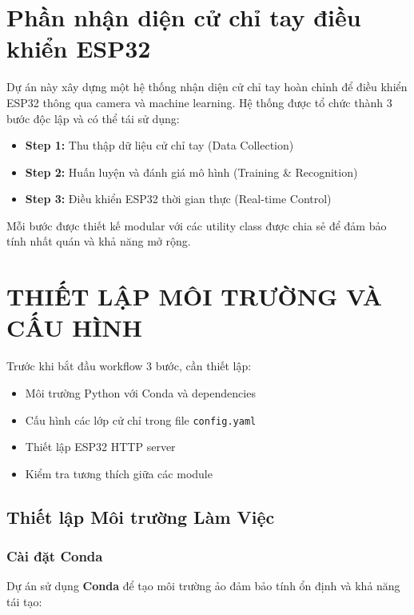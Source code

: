 \section{Phần nhận diện cử chỉ tay điều khiển ESP32}

Dự án này xây dựng một hệ thống nhận diện cử chỉ tay hoàn chỉnh để điều khiển ESP32 thông qua camera và machine learning. Hệ thống được tổ chức thành 3 bước độc lập và có thể tái sử dụng:

\begin{itemize}
    \item \textbf{Step 1:} Thu thập dữ liệu cử chỉ tay (Data Collection)
    \item \textbf{Step 2:} Huấn luyện và đánh giá mô hình (Training \& Recognition)
    \item \textbf{Step 3:} Điều khiển ESP32 thời gian thực (Real-time Control)
\end{itemize}

Mỗi bước được thiết kế modular với các utility class được chia sẻ để đảm bảo tính nhất quán và khả năng mở rộng.

\section*{THIẾT LẬP MÔI TRƯỜNG VÀ CẤU HÌNH}

Trước khi bắt đầu workflow 3 bước, cần thiết lập:

\begin{itemize}
    \item Môi trường Python với Conda và dependencies
    \item Cấu hình các lớp cử chỉ trong file \texttt{config.yaml}
    \item Thiết lập ESP32 HTTP server
    \item Kiểm tra tương thích giữa các module
\end{itemize}

\subsection{Thiết lập Môi trường Làm Việc}

\subsubsection{Cài đặt Conda}

Dự án sử dụng \textbf{Conda} để tạo môi trường ảo đảm bảo tính ổn định và khả năng tái tạo:

